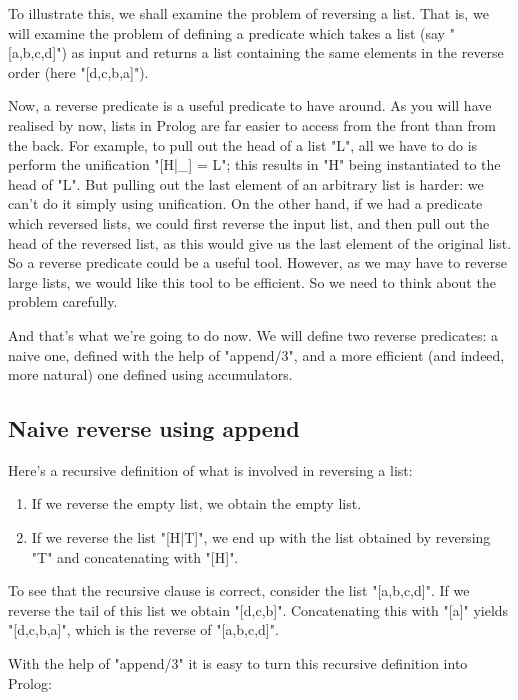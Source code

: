 To illustrate this, we shall examine the problem of reversing a list.
That is, we will examine the problem of defining a predicate which
takes a list (say "[a,b,c,d]") as input and returns a list
containing the same elements in the reverse order (here
"[d,c,b,a]").

Now, a reverse predicate is a useful predicate to have around. As you
will have realised by now, lists in Prolog are far easier to access
from the front than from the back. For example, to pull out the head
of a list "L", all we have to do is perform the unification
"[H|_] = L"; this results in "H" being instantiated to the head of "L". But
pulling out the last element of an arbitrary list is harder: we can't
do it simply using unification.  On the other hand, if we had a
predicate which reversed lists, we could first reverse the input list,
and then pull out the head of the reversed list, as this would give us
the last element of the original list.  So a reverse predicate could
be a useful tool.  However, as we may have to reverse large lists, we
would like this tool to be efficient.  So we need to think about the
problem carefully.

And that's what we're going to do now.  We will define two reverse
predicates: a naive one, defined with the help of "append/3", and a
more efficient (and indeed, more natural) one defined using
accumulators.

\subsection*{Naive reverse using append}\label{SUBSEC.L6.REVERSE.NAIVE}



Here's a recursive definition of what is involved in reversing a list:

\begin{enumerate}
\item{}If we reverse the empty list, we obtain the
        empty list.
\item{}If we reverse the list "[H|T]", we end up with the list
        obtained by reversing "T" and concatenating with "[H]".
\end{enumerate}
To see that the recursive clause is correct, consider the list
"[a,b,c,d]".  If we reverse the tail of this list we obtain
"[d,c,b]".  Concatenating this with "[a]" yields
"[d,c,b,a]", which is the reverse of "[a,b,c,d]".

With the help of "append/3" it is easy to turn this recursive
definition into Prolog:

